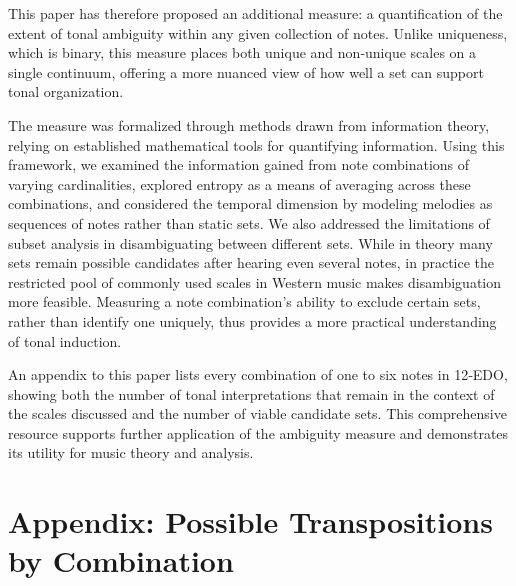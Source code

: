 \documentclass[10pt,twocolumn]{article}
\numberwithin{equation}{section} %
\begin{document}
    This paper has therefore proposed an additional measure: a quantification of the extent of tonal ambiguity within any given collection of notes.
    Unlike uniqueness, which is binary, this measure places both unique and non‑unique scales on a single continuum, offering a more nuanced view of how well a set can support tonal organization.

    The measure was formalized through methods drawn from information theory, relying on established mathematical tools for quantifying information.
    Using this framework, we examined the information gained from note combinations of varying cardinalities, explored entropy as a means of averaging across these combinations, and considered the temporal dimension by modeling melodies as sequences of notes rather than static sets.
    We also addressed the limitations of subset analysis in disambiguating between different sets.
    While in theory many sets remain possible candidates after hearing even several notes, in practice the restricted pool of commonly used scales in Western music makes disambiguation more feasible.
    Measuring a note combination's ability to exclude certain sets, rather than identify one uniquely, thus provides a more practical understanding of tonal induction.

    An appendix to this paper lists every combination of one to six notes in 12‑EDO, showing both the number of tonal interpretations that remain in the context of the scales discussed and the number of viable candidate sets.
    This comprehensive resource supports further application of the ambiguity measure and demonstrates its utility for music theory and analysis.

    \vfill\break
    
    

    \clearpage

    \newcommand{\sone}[1]{\cellcolor{gray!20}{#1}} %
    \newcommand{\diag}{\rowcolor{green!12}}        %

    \section*{Appendix: Possible Transpositions by Combination}

    \begingroup
    \footnotesize                           %
\end{document}
